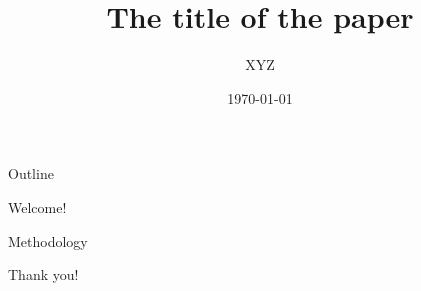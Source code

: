 \documentclass[12pt]{beamer}
\title{The title of the paper}
\author{XYZ}
\date{\today}
\begin{document}
\begin{frame}
\titlepage
\end{frame}
\begin{frame}{Outline}
\tableofcontents
\end{frame}

\begin{frame}[standout]
Welcome!
\end{frame}


\begin{frame}{Methodology}
\tableofcontents
\end{frame}

\begin{frame}[standout]
Thank you!
\end{frame}
\end{document}
